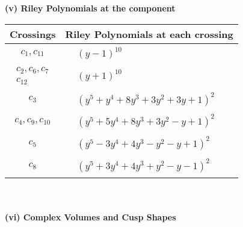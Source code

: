 \documentclass[1p]{elsarticle_modified}
\theoremstyle{definition}
\begin{document}
\newpage\renewcommand{\arraystretch}{1}
\flushleft \textbf{(v) Riley Polynomials at the component}\newline \\
\begin{tabular}{m{50pt}|m{274pt}}
Crossings & \hspace{64pt}Riley Polynomials at each crossing \\
\hline $$\begin{aligned}c_{1},c_{11}\end{aligned}$$&$\begin{aligned}
&(y-1)^{10}
\end{aligned}$\\
\hline $$\begin{aligned}c_{2},c_{6},c_{7}\\c_{12}\end{aligned}$$&$\begin{aligned}
&(y+1)^{10}
\end{aligned}$\\
\hline $$\begin{aligned}c_{3}\end{aligned}$$&$\begin{aligned}
&(y^5+y^4+8 y^3+3 y^2+3 y+1)^2
\end{aligned}$\\
\hline $$\begin{aligned}c_{4},c_{9},c_{10}\end{aligned}$$&$\begin{aligned}
&(y^5+5 y^4+8 y^3+3 y^2- y+1)^2
\end{aligned}$\\
\hline $$\begin{aligned}c_{5}\end{aligned}$$&$\begin{aligned}
&(y^5-3 y^4+4 y^3- y^2- y+1)^2
\end{aligned}$\\
\hline $$\begin{aligned}c_{8}\end{aligned}$$&$\begin{aligned}
&(y^5+3 y^4+4 y^3+y^2- y-1)^2
\end{aligned}$\\
\hline
\end{tabular}\\~\\
\newpage\flushleft \textbf{(vi) Complex Volumes and Cusp Shapes}
\end{document}

